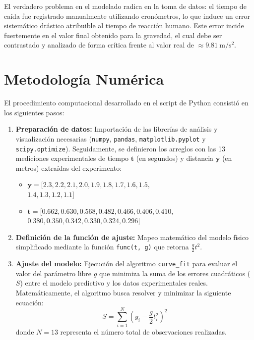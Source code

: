 \documentclass[12pt,a4paper]{article}
\begin{document}
El verdadero problema en el modelado radica en la toma de datos: el tiempo de caída fue registrado manualmente utilizando cronómetros, lo que induce un error sistemático drástico atribuible al tiempo de reacción humano. Este error incide fuertemente en el valor final obtenido para la gravedad, el cual debe ser contrastado y analizado de forma crítica frente al valor real de $\approx 9.81\ \mathrm{m/s^2}$.

\section{Metodología Numérica}
El procedimiento computacional desarrollado en el script de Python consistió en los siguientes pasos:
\begin{enumerate}
    \item \textbf{Preparación de datos:} Importación de las librerías de análisis y visualización necesarias (\texttt{numpy}, \texttt{pandas}, \texttt{matplotlib.pyplot} y \texttt{scipy.optimize}). Seguidamente, se definieron los arreglos con las 13 mediciones experimentales de tiempo $\mathbf{t}$ (en segundos) y distancia $\mathbf{y}$ (en metros) extraídas del experimento:
    \begin{itemize}
        \item $\mathbf{y} = [2.3, 2.2, 2.1, 2.0, 1.9, 1.8, 1.7, 1.6, 1.5,$ \\
        $1.4, 1.3, 1.2, 1.1]$
        \item $\mathbf{t} = [0.662, 0.630, 0.568, 0.482, 0.466, 0.406, 0.410,$ \\
        $0.380, 0.350, 0.342, 0.330, 0.324, 0.296]$
    \end{itemize}
    \item \textbf{Definición de la función de ajuste:} Mapeo matemático del modelo físico simplificado mediante la función \texttt{func(t, g)} que retorna $\frac{g}{2} t^2$.
    \item \textbf{Ajuste del modelo:} Ejecución del algoritmo \texttt{curve\_fit} para evaluar el valor del parámetro libre $g$ que minimiza la suma de los errores cuadráticos ($S$) entre el modelo predictivo y los datos experimentales reales. Matemáticamente, el algoritmo busca resolver y minimizar la siguiente ecuación:
    $$ S = \sum_{i=1}^{N} \left( y_i - \frac{g}{2}t_i^2 \right)^2 $$
    donde $N=13$ representa el número total de observaciones realizadas. 


\end{enumerate}
\end{document}
